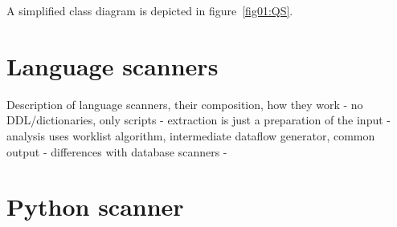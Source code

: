 A simplified class diagram is depicted in figure~\ref{fig01:QS}.





\section{Language scanners}
Description of language scanners, their composition, how they work
- no DDL/dictionaries, only scripts
- extraction is just a preparation of the input
- analysis uses worklist algorithm, intermediate dataflow generator, common output
- differences with database scanners
- 

\section{Python scanner}